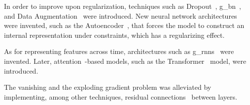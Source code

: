 \par
In order to improve upon regularization, techniques such as Dropout~\cite{dropout}, \gls*{g_bn}~\cite{batchnorm}, and Data Augmentation~\cite{data_augmentation} were introduced. New neural network architectures were invented, such as the Autoencoder~\cite{autoencoder}, that forces the model to construct an internal representation under constraints, which has a regularizing effect.
\par
As for representing features across time, architectures such as \glspl*{g_rnn}~\cite{lstm,gru} were invented. Later, attention~\cite{attention}-based models, such as the Transformer~\cite{transformer} model, were introduced.\par
The vanishing and the exploding gradient problem was alleviated by implementing, among other techniques, residual connections~\cite{resnet} between layers.
